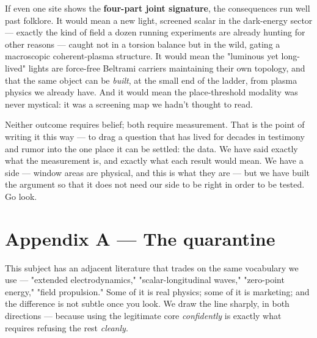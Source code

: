 \documentclass[11pt]{article}
\begin{document}
If even one site shows the \textbf{four-part joint signature}, the consequences run well past folklore. It would mean a new light, screened scalar in the dark-energy sector --- exactly the kind of field a dozen running experiments are already hunting for other reasons --- caught not in a torsion balance but in the wild, gating a macroscopic coherent-plasma structure. It would mean the "luminous yet long-lived" lights are force-free Beltrami carriers maintaining their own topology, and that the same object can be \emph{built}, at the small end of the ladder, from plasma physics we already have. And it would mean the place-threshold modality was never mystical: it was a screening map we hadn't thought to read.

Neither outcome requires belief; both require measurement. That is the point of writing it this way --- to drag a question that has lived for decades in testimony and rumor into the one place it can be settled: the data. We have said exactly what the measurement is, and exactly what each result would mean. We have a side --- window areas are physical, and this is what they are --- but we have built the argument so that it does not need our side to be right in order to be tested. Go look.

\section*{Appendix A --- The quarantine}
This subject has an adjacent literature that trades on the same vocabulary we use --- "extended electrodynamics," "scalar-longitudinal waves," "zero-point energy," "field propulsion." Some of it is real physics; some of it is marketing; and the difference is not subtle once you look. We draw the line sharply, in both directions --- because using the legitimate core \emph{confidently} is exactly what requires refusing the rest \emph{cleanly}.
\end{document}
